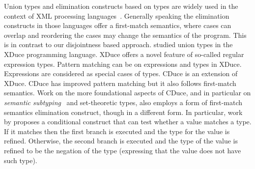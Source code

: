 \begin{comment}
\citet{freeman1991refinement} studied union types along with intersection types
in setting of refinement types for ML. Main focus of their work is to infer
more precise types of expressions, which they call
refinement types. Their work is targeted to contribute for the types
in ML and not for the expressions. Therefore, they did not define
expressions and dynamic semantics. On the contrary, our work provides
a complete calculus with type sound dynamic semantics.
\bruno{and ... Do they have an elimination construct for unions?
  If so how is that related to our work?}.
\baber{I added few more lines in Freeman citation.}
\end{comment}
Union types and elimination constructs based on types are
widely used in the context of XML processing languages~\cite{hosoya2003xduce,benzaken2003cduce}.
Generally speaking the elimination constructs in those
languages offer a first-match semantics,
where cases can overlap and reordering the cases may change the semantics of the program.
This is in contrast to our disjointness based approach.
\citet{hosoya2003xduce} studied union types
in the XDuce programming language. XDuce offers a novel feature of
so-called regular expression types. Pattern matching can be on
expressions and types in XDuce.  Expressions are considered as special
cases of types.  CDuce
\cite{benzaken2003cduce} is an extension of XDuce. CDuce has improved
pattern matching but it also
follows first-match semantics. Work on the more foundational aspects
of CDuce, and in particular on \emph{semantic subtyping}~\cite{frisch2002semantic}
and set-theoretic types,
also employs a form of first-match semantics elimination construct, though in a different form.
In particular, work by \citet{castagna2005gentle,castagna2017gradual}
proposes a conditional construct that can test whether a value matches a type.
If it matches then the first branch is executed and the type for the value is refined.
Otherwise, the second branch is executed and the type of the value is refined to be
the negation of the type (expressing that the value does not have such type).
